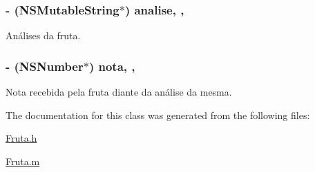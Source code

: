 \subsubsection[{analise}]{\setlength{\rightskip}{0pt plus 5cm}-\/ (N\+S\+Mutable\+String$\ast$) analise\hspace{0.3cm}{\ttfamily [read]}, {\ttfamily [write]}, {\ttfamily [atomic]}}\label{interface_fruta_a9f497fe605ef82076cac02a5f088f8a5}


Análises da fruta. 

\hypertarget{interface_fruta_a6bd1235d2a12551a4d02d9885c841539}{}
\subsubsection[{nota}]{\setlength{\rightskip}{0pt plus 5cm}-\/ (N\+S\+Number$\ast$) nota\hspace{0.3cm}{\ttfamily [read]}, {\ttfamily [write]}, {\ttfamily [atomic]}}\label{interface_fruta_a6bd1235d2a12551a4d02d9885c841539}


Nota recebida pela fruta diante da análise da mesma. 



The documentation for this class was generated from the following files\+:\begin{DoxyCompactItemize}
\item 
\hyperlink{_fruta_8h}{Fruta.\+h}\item 
\hyperlink{_fruta_8m}{Fruta.\+m}\end{DoxyCompactItemize}

